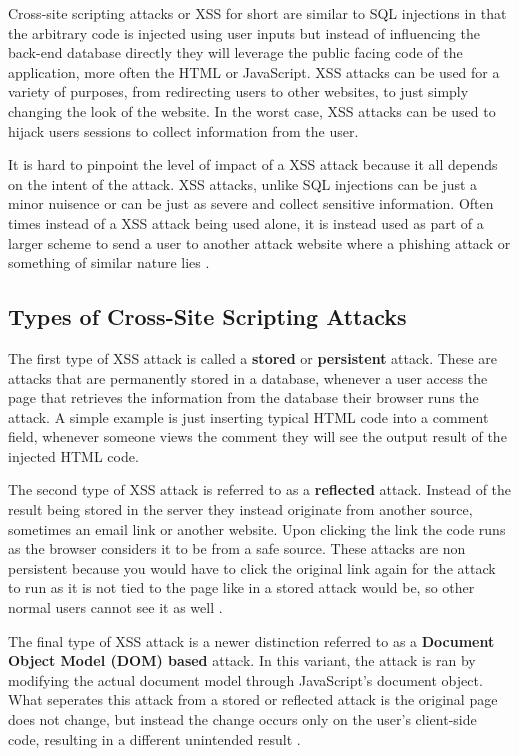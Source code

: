Cross-site scripting attacks or XSS for short are similar to SQL injections in that the arbitrary code is injected using user inputs but instead of influencing the back-end database directly they will leverage the public facing code of the application, more often the HTML or JavaScript.  XSS attacks can be used for a variety of purposes, from redirecting users to other websites, to just simply changing the look of the website.  In the worst case, XSS attacks can be used to hijack users sessions to collect information from the user.

It is hard to pinpoint the level of impact of a XSS attack because it all depends on the intent of the attack.  XSS attacks, unlike SQL injections can be just a minor nuisence or can be just as severe and collect sensitive information.  Often times instead of a XSS attack being used alone, it is instead used as part of a larger scheme to send a user to another attack website where a phishing attack or something of similar nature lies  \cite{aSurveyOnWeb}\cite{xssdm}.

\subsection{Types of Cross-Site Scripting Attacks}\label{sec:xssTypes}

The first type of XSS attack is called a \textbf{stored} or \textbf{persistent} attack.  These are attacks that are permanently stored in a database, whenever a user access the page that retrieves the information from the database their browser runs the attack. A simple example is just inserting typical HTML code into a comment field, whenever someone views the comment they will see the output result of the injected HTML code.

The second type of XSS attack is referred to as a \textbf{reflected} attack.  Instead of the result being stored in the server they instead originate from another source, sometimes an email link or another website.  Upon clicking the link the code runs as the browser considers it  to be from a safe source.  These attacks are non persistent because you would have to click the original link again for the attack to run as it is not tied to the page like in a stored attack would be, so other normal users cannot see it as well \cite{owaspXSS}.

The final type of XSS attack is a newer distinction referred to as a \textbf{Document Object Model (DOM) based} attack.  In this variant, the attack is ran by modifying the actual document model through JavaScript's document object.  What seperates this attack from a stored or reflected attack is the original page does not change, but instead the change occurs only on the user's client-side code, resulting in a different unintended result \cite{owaspXSSDOM}.

